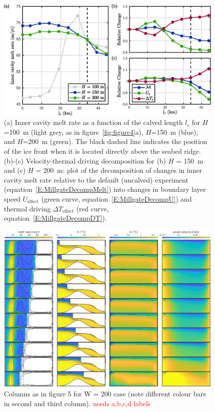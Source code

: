 \documentclass[draft]{agujournal2019}
\newcommand{\red}[1]{\textcolor{red}{#1}}
\begin{document}
\begin{figure}
    \centering
    \includegraphics[width = \textwidth]{../make_figures/plots/figure6.eps}
    \caption{(a) Inner cavity melt rate as a function of the calved length $l_c$ for $H$=100~m (light grey, as in figure~\ref{fig:figure4}a), $H$=150~m (blue), and $H$=200~m (green). The black dashed line indicates the position of the ice front when it is located directly above the seabed ridge. (b)-(c) Velocity-thermal driving decomposition for (b) $H$ = 150~m and (c) $H$ = 200~m: plot of the decomposition of changes in inner cavity melt rate relative to the default (uncalved) experiment (equation~\eqref{E:MillgateDecompMelt}) into changes in boundary layer speed $U_\text{effect}$ (green curve, equation~\eqref{E:MillgateDecompU}) and thermal driving $\Delta T_{\text{effect}}$ (red curve, equation~\eqref{E:MillgateDecompDT}).}
    \label{fig:figure6}
\end{figure}

\begin{figure}
    \centering
    \includegraphics[width = \textwidth]{../make_figures/plots/figure7.eps}
    \caption{Columns as in figure 5 for W = 200 case (note different colour bars in second and third column). \red{needs a,b,c,d labels}}
    \label{fig:figure7}
\end{figure}
\end{document}
